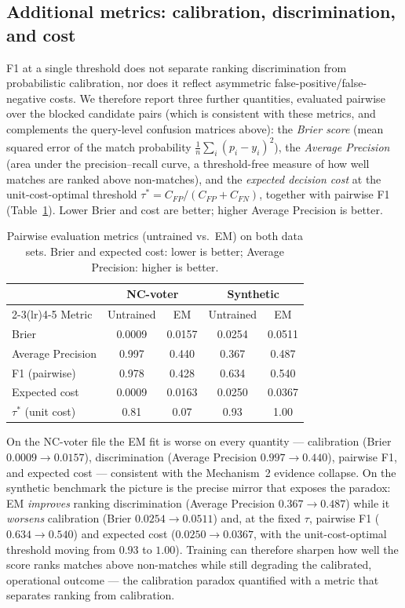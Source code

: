 \documentclass[conference]{IEEEtran}
\begin{document}
\subsection{Additional metrics: calibration, discrimination, and cost}
\label{sec:metrics}
F1 at a single threshold does not separate ranking discrimination from probabilistic
calibration, nor does it reflect asymmetric false-positive/false-negative costs. We therefore
report three further quantities, evaluated pairwise over the blocked candidate pairs (which
is consistent with these metrics, and complements the query-level confusion matrices above):
the \emph{Brier score} (mean squared error of the match probability
$\frac1n\sum_i(p_i-y_i)^2$), the \emph{Average Precision} (area under the precision--recall
curve, a threshold-free measure of how well matches are ranked above non-matches), and the
\emph{expected decision cost} at the unit-cost-optimal threshold
$\tau^*=C_{FP}/(C_{FP}+C_{FN})$, together with pairwise F1 (Table~\ref{tab:metrics}).
Lower Brier and cost are better; higher Average Precision is better.

\begin{table}[t]
\centering
\caption{Pairwise evaluation metrics (untrained vs.\ EM) on both data sets. Brier and
expected cost: lower is better; Average Precision: higher is better.}
\label{tab:metrics}
\begin{tabular}{lcccc}
\toprule
 & \multicolumn{2}{c}{NC-voter} & \multicolumn{2}{c}{Synthetic} \\
\cmidrule(lr){2-3}\cmidrule(lr){4-5}
Metric & Untrained & EM & Untrained & EM \\
\midrule
Brier & 0.0009 & 0.0157 & 0.0254 & 0.0511 \\
Average Precision & 0.997 & 0.440 & 0.367 & 0.487 \\
F1 (pairwise) & 0.978 & 0.428 & 0.634 & 0.540 \\
Expected cost & 0.0009 & 0.0163 & 0.0250 & 0.0367 \\
$\tau^*$ (unit cost) & 0.81 & 0.07 & 0.93 & 1.00 \\
\bottomrule
\end{tabular}
\end{table}

On the NC-voter file the EM fit is worse on every quantity --- calibration (Brier
$0.0009\to0.0157$), discrimination (Average Precision $0.997\to0.440$), pairwise F1, and
expected cost --- consistent with the Mechanism~2 evidence collapse. On the synthetic
benchmark the picture is the precise mirror that exposes the paradox: EM \emph{improves}
ranking discrimination (Average Precision $0.367\to0.487$) while it \emph{worsens}
calibration (Brier $0.0254\to0.0511$) and, at the fixed $\tau$, pairwise F1
($0.634\to0.540$) and expected cost ($0.0250\to0.0367$, with the unit-cost-optimal threshold
moving from $0.93$ to $1.00$). Training can therefore sharpen how well the score ranks
matches above non-matches while still degrading the calibrated, operational outcome --- the
calibration paradox quantified with a metric that separates ranking from calibration.
\end{document}
